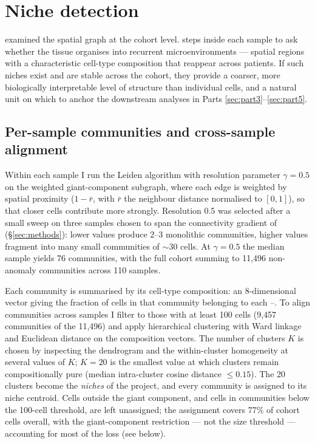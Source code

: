 \section{Niche detection}
\label{sec:part2}

 examined the spatial graph at the cohort level.  steps inside each sample to ask whether the tissue organises into recurrent microenvironments --- spatial regions with a characteristic cell-type composition that reappear across patients. If such niches exist and are stable across the cohort, they provide a coarser, more biologically interpretable level of structure than individual cells, and a natural unit on which to anchor the downstream analyses in Parts \ref{sec:part3}--\ref{sec:part5}.

\subsection*{Per-sample communities and cross-sample alignment}

Within each sample I run the Leiden algorithm \cite{traag2019leiden} with resolution parameter $\gamma = 0.5$ on the weighted giant-component subgraph, where each edge is weighted by spatial proximity ($1 - \bar{r}$, with $\bar{r}$ the neighbour distance normalised to $[0,1]$), so that closer cells contribute more strongly. Resolution 0.5 was selected after a small sweep on three samples chosen to span the connectivity gradient of  (\S\ref{sec:methods}): lower values produce 2--3 monolithic communities, higher values fragment into many small communities of $\sim 30$ cells. At $\gamma = 0.5$ the median sample yields 76 communities, with the full cohort summing to 11{,}496 non-anomaly communities across 110 samples.

Each community is summarised by its cell-type composition: an 8-dimensional vector giving the fraction of cells in that community belonging to each --. To align communities across samples I filter to those with at least 100 cells (9{,}457 communities of the 11{,}496) and apply hierarchical clustering with Ward linkage and Euclidean distance on the composition vectors. The number of clusters $K$ is chosen by inspecting the dendrogram and the within-cluster homogeneity at several values of $K$; $K = 20$ is the smallest value at which clusters remain compositionally pure (median intra-cluster cosine distance $\leq 0.15$). The 20 clusters become the \emph{niches} of the project, and every community is assigned to its niche centroid. Cells outside the giant component, and cells in communities below the 100-cell threshold, are left unassigned; the assignment covers 77\% of cohort cells overall, with the giant-component restriction --- not the size threshold --- accounting for most of the loss (see below).

